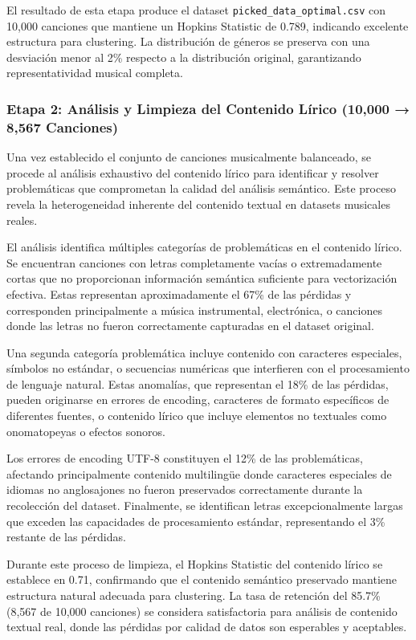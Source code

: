 \documentclass[12pt,a4paper]{report}
\begin{document}
El resultado de esta etapa produce el dataset \texttt{picked\_data\_optimal.csv} con 10,000 canciones que mantiene un Hopkins Statistic de 0.789, indicando excelente estructura para clustering. La distribución de géneros se preserva con una desviación menor al 2\% respecto a la distribución original, garantizando representatividad musical completa.

\subsubsection{Etapa 2: Análisis y Limpieza del Contenido Lírico (10,000 → 8,567 Canciones)}

Una vez establecido el conjunto de canciones musicalmente balanceado, se procede al análisis exhaustivo del contenido lírico para identificar y resolver problemáticas que comprometan la calidad del análisis semántico. Este proceso revela la heterogeneidad inherente del contenido textual en datasets musicales reales.

El análisis identifica múltiples categorías de problemáticas en el contenido lírico. Se encuentran canciones con letras completamente vacías o extremadamente cortas que no proporcionan información semántica suficiente para vectorización efectiva. Estas representan aproximadamente el 67\% de las pérdidas y corresponden principalmente a música instrumental, electrónica, o canciones donde las letras no fueron correctamente capturadas en el dataset original.

Una segunda categoría problemática incluye contenido con caracteres especiales, símbolos no estándar, o secuencias numéricas que interfieren con el procesamiento de lenguaje natural. Estas anomalías, que representan el 18\% de las pérdidas, pueden originarse en errores de encoding, caracteres de formato específicos de diferentes fuentes, o contenido lírico que incluye elementos no textuales como onomatopeyas o efectos sonoros.

Los errores de encoding UTF-8 constituyen el 12\% de las problemáticas, afectando principalmente contenido multilingüe donde caracteres especiales de idiomas no anglosajones no fueron preservados correctamente durante la recolección del dataset. Finalmente, se identifican letras excepcionalmente largas que exceden las capacidades de procesamiento estándar, representando el 3\% restante de las pérdidas.

Durante este proceso de limpieza, el Hopkins Statistic del contenido lírico se establece en 0.71, confirmando que el contenido semántico preservado mantiene estructura natural adecuada para clustering. La tasa de retención del 85.7\% (8,567 de 10,000 canciones) se considera satisfactoria para análisis de contenido textual real, donde las pérdidas por calidad de datos son esperables y aceptables.
\end{document}
